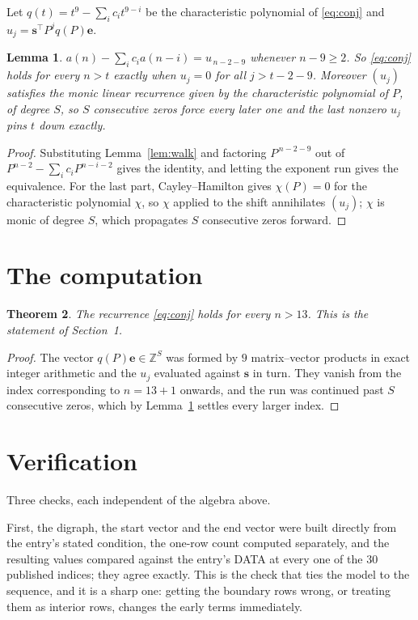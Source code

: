 \documentclass[11pt,a4paper]{article}
\theoremstyle{plain}
\newtheorem{theorem}{Theorem}
\newtheorem{lemma}[theorem]{Lemma}
\theoremstyle{definition}
\begin{document}
Let $q(t)=t^{9}-\sum_i c_i t^{9-i}$ be the characteristic polynomial of
\eqref{eq:conj} and $u_j=\mathbf{s}^{\!\top}P^{j}q(P)\mathbf{e}$.

\begin{lemma}\label{lem:crit}
$a(n)-\sum_i c_i a(n-i)=u_{\,n-2-9}$ whenever $n-9\ge2$. So \eqref{eq:conj}
holds for every $n>t$ exactly when $u_j=0$ for all $j>t-2-9$. Moreover $(u_j)$
satisfies the monic linear recurrence given by the characteristic polynomial of $P$, of
degree $S$, so $S$ consecutive zeros force every later one and the last nonzero $u_j$ pins
$t$ down exactly.
\end{lemma}

\begin{proof}
Substituting Lemma~\ref{lem:walk} and factoring $P^{\,n-2-9}$ out of
$P^{n-2}-\sum_i c_i P^{n-i-2}$ gives the identity, and letting the exponent run gives the
equivalence. For the last part, Cayley--Hamilton gives $\chi(P)=0$ for the characteristic
polynomial $\chi$, so $\chi$ applied to the shift annihilates $(u_j)$; $\chi$ is monic of
degree $S$, which propagates $S$ consecutive zeros forward.
\end{proof}

\section{The computation}

\begin{theorem}
The recurrence \eqref{eq:conj} holds for every $n>13$. This is the statement of
Section~1.
\end{theorem}

\begin{proof}
The vector $q(P)\mathbf{e}\in\mathbb{Z}^{S}$ was formed by $9$ matrix--vector
products in exact integer arithmetic and the $u_j$ evaluated against $\mathbf{s}$ in turn.
They vanish from the index corresponding to $n=13+1$ onwards, and the run was continued
past $S$ consecutive zeros, which by Lemma~\ref{lem:crit} settles every larger index.
\end{proof}

\section{Verification}

Three checks, each independent of the algebra above.

First, the digraph, the start vector and the end vector were built directly from the
entry's stated condition, the one-row count computed separately, and the resulting values
compared against the entry's DATA at every one of the $30$ published indices; they
agree exactly. This is the check that ties the model to the sequence, and it is a sharp one:
getting the boundary rows wrong, or treating them as interior rows, changes the early terms
immediately.
\end{document}
